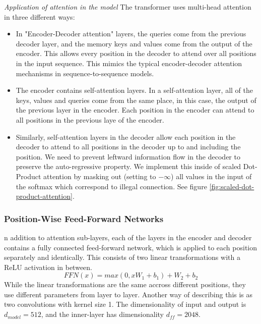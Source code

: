 \documentclass{report}
\begin{document}
\textit{Application of attention in the model}
The transformer uses multi-head attention in three different ways:
\begin{itemize}
	\item In "Encoder-Decoder attention" layers, the queries come from the previous decoder layer, and the memory keys and values come from the output of the encoder. This allows every position in the decoder to attend over all positions in the input sequence. This mimics the typical encoder-decoder attention mechanisms in sequence-to-sequence models.
	\item The encoder contains self-attention layers. In a self-attention layer, all of the keys, values and queries come from the same place, in this case, the output of the previous layer in the encoder. Each position in the encoder can attend to all positions in the previous laye of the encoder.
	\item Similarly, self-attention layers in the decoder allow each position in the decoder to attend to all positions in the decoder up to and including the position. We need to prevent leftward information flow in the decoder to preserve the auto-regressive property. We implement this inside of scaled Dot-Product attention by masking out (setting to $-\infty$) all values in the input of the softmax which correspond to illegal connection. See figure \ref{fig:scaled-dot-product-attention}. %
\end{itemize}
	
\subsubsection{Position-Wise Feed-Forward Networks}
\label{sssec:transformer-position-wise-ffn}
n addition to attention sub-layers, each of the layers in the encoder and decoder contains a fully connected feed-forward network, which is applied to each position separately and identically. This consists of two linear transformations with a ReLU activation in between.
\begin{equation}
	FFN(x)=max(0, x W_1 + b_1) + W_2 + b_2 %
	\label{eq:transformer-ffn}
\end{equation}
While the linear transformations are the same accross different positions, they use different parameters from layer to layer. Another way of describing this is as two convolutions with kernel size 1. The dimensionality of input and output is $d_{model}=512$, and the inner-layer has dimensionality $d_{ff}=2048$.
\end{document}
